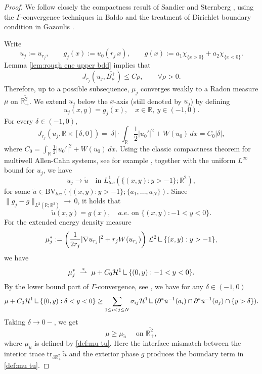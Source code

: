 \documentclass[leqno,11pt]{amsart}
\let\pa=\partial
\let\f=\frac
\let\G= \Gamma
\let\pa=\partial
\let\na=\nabla
\theoremstyle{remark}
\newcommand{\BR}{\mathbb{R}}
\newcommand{\ch}{\mathcal{H}^1}
\newcommand{\mres}{\mathbin{\vrule height 1.6ex depth 0pt width 0.13ex\vrule height 0.13ex depth 0pt width 1.1ex}}
\begin{document}
\begin{proof}
We follow closely the compactness result of Sandier and Sternberg \cite[Proposition 3.1]{ss2024}, using the $\G$-convergence techniques in Baldo \cite{Baldo} and the treatment of Dirichlet boundary condition in Gazoulis \cite{gazoulis}.

Write 
\begin{equation*}
    u_j:=u_{r_j},\qquad g_j(x):=u_0(r_j\,x),\qquad g(x):=a_1\chi_{\{x>0\}}+a_2\chi_{\{x<0\}}.
\end{equation*}
Lemma \ref{lem:rough ene upper bdd} implies that 
\[
J_{r_j}(u_j,\overline{B_\rho^+})\leq C\rho, \qquad \forall \rho>0.
\]
Therefore, up to a possible subsequence, $\mu_j$ converges weakly to a Radon measure $\mu$ on $\overline{\BR_+^2}$. We extend $u_j$ below the $x$-axis (still denoted by $u_j$) by defining
\begin{equation*}
u_j(x,y)=g_j(x),\quad x\in \mathbb{R}, \ y\in (-1,0).    
\end{equation*}
For every $\delta\in (-1,0)$, 
\begin{equation*}
    J_{r_j}(u_j, \BR\times[\delta,0])=|\delta|\cdot \int_\BR \f12|u_0'|^2+W(u_0)\,dx=C_0|\delta|,
\end{equation*}
where $C_0=\int_\BR \f12|u_0'|^2+W(u_0)\,dx$. Using the classic compactness theorem for multiwell Allen-Cahn systems, see for example \cite[Proposition 4.1]{Baldo}, together with the uniform $L^\infty$ bound for $u_j$, we have 
\begin{equation*}
    u_j\to \tilde{u} \quad \text{in }L^1_{loc}(\{(x,y):y>-1\};\BR^2),
\end{equation*}
for some $\tilde{u}\in \mathrm{BV}_{loc}(\{(x,y):y>-1\};\{a_1,...,a_N\})$.  Since $\|g_j- g\|_{L^2(\BR;\BR^2)}\to\,0$, it holds that 
\[
\tilde{u}(x,y) =g(x), \quad a.e. \text{ on }\{(x,y):-1<y<0\}. 
\]
For the extended energy density measure
\[
\mu_j^*:=\bigg(\frac{1}{2r_j}|\na u_{r_j}|^2+r_j W(u_{r_j})\bigg)\ \mathcal{L}^2\mres \{(x,y):y>-1\},
\]
we have 
\[
\mu_j^*\ \overset{\ast}{\rightharpoonup}\ \mu+ C_0\ch\mres\{(0,y):-1<y<0\}. 
\]
By the lower bound part of $\G$-convergence, see \cite[(2.8)]{Baldo}, we have for any $\delta\in(-1,0)$
\begin{equation*}
    \mu+C_0\ch\mres\{(0,y):\delta< y<0\}\geq \sum_{1\leq i<j\leq N} \sigma_{ij} \ch\mres (\pa^* \tilde{u}^{-1}(a_i) \cap \pa^*\tilde{u}^{-1}(a_j)\cap\{y>\delta\} ). 
\end{equation*}
Taking $\delta \to 0-$, we get 
\begin{equation}\label{mu geq mutu}
    \mu\geq \mu_{\tilde{u}}  \quad\text{ on } \overline{\BR_+^2},
\end{equation}
where $\mu_{\tilde{u}}$ is defined by \eqref{def:mu tu}. Here the interface mismatch between the interior trace $\mathrm{tr}_{\pa\BR^2_+}\,\tilde{u}$ and the exterior phase $g$ produces the boundary term in \eqref{def:mu tu}.


\end{proof}
\end{document}
